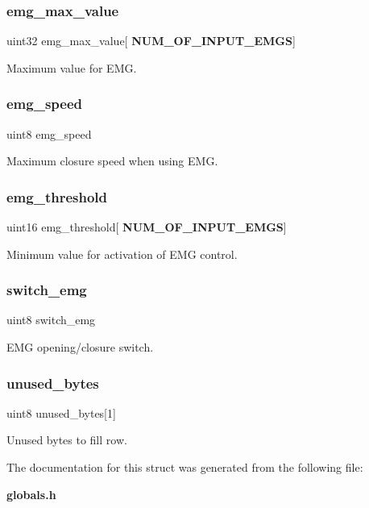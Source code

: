 \subsubsection{emg\+\_\+max\+\_\+value}
{\footnotesize\ttfamily uint32 emg\+\_\+max\+\_\+value[\textbf{ N\+U\+M\+\_\+\+O\+F\+\_\+\+I\+N\+P\+U\+T\+\_\+\+E\+M\+GS}]}

Maximum value for E\+MG. \mbox{\label{structst__emg_ae8e800591064bf14eb2dd3a3fb2c325b}} 
\subsubsection{emg\+\_\+speed}
{\footnotesize\ttfamily uint8 emg\+\_\+speed}

Maximum closure speed when using E\+MG. \mbox{\label{structst__emg_aa406dc76b9d1c8741dc42db9ac4dab51}} 
\subsubsection{emg\+\_\+threshold}
{\footnotesize\ttfamily uint16 emg\+\_\+threshold[\textbf{ N\+U\+M\+\_\+\+O\+F\+\_\+\+I\+N\+P\+U\+T\+\_\+\+E\+M\+GS}]}

Minimum value for activation of E\+MG control. \mbox{\label{structst__emg_a90c7b59f97a26bf3da8b26b145b32919}} 
\subsubsection{switch\+\_\+emg}
{\footnotesize\ttfamily uint8 switch\+\_\+emg}

E\+MG opening/closure switch. \mbox{\label{structst__emg_ac60066bd7150d73c95439a5e2af21e05}} 
\subsubsection{unused\+\_\+bytes}
{\footnotesize\ttfamily uint8 unused\+\_\+bytes[1]}

Unused bytes to fill row. 

The documentation for this struct was generated from the following file\+:\begin{DoxyCompactItemize}
\item 
\textbf{ globals.\+h}\end{DoxyCompactItemize}
